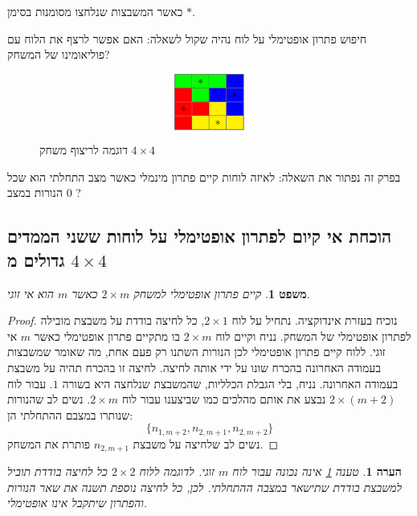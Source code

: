 \documentclass[12pt,leqno]{article}
\theoremstyle{theoremdd}
\newtheorem{theorem}{משפט}[section]
\newtheorem{comm}{הערה}[section]
\begin{document}
כאשר המשבצות שנלחצו מסומנות בסימן 
$*$.

חיפוש פתרון אופטימלי על לוח נהיה שקול לשאלה: האם אפשר 
לרצף את הלוח עם 
פוליאומינו
של המשחק?
\begin{figure}
    \caption*{דוגמה לריצוף משחק
    $4 \times 4$}
    \[ \begin{array}{|c|c|c|c|}
        \hline
        \cellcolor{green}&\cellcolor{green}* &\cellcolor{green} &\cellcolor{blue} \\
        \hline
        \cellcolor{red}&\cellcolor{green} &\cellcolor{blue} &\cellcolor{blue} *\\
        \hline
        \cellcolor{red}*&\cellcolor{red} &\cellcolor{yellow} &\cellcolor{blue} \\
        \hline
        \cellcolor{red}&\cellcolor{yellow}&\cellcolor{yellow}*&\cellcolor{yellow} \\
        \hline
        \end{array} \]
\end{figure}

בפרק זה נפתור את השאלה: לאיזה לוחות קיים פתרון מינמלי
כאשר מצב התחלתי הוא שכל הנורות במצב
$0$
?

\subsection{הוכחת אי קיום לפתרון אופטימלי על לוחות ששני הממדים גדולים מ
\texorpdfstring{$4 \times 4$}{4 x 4}}
\begin{theorem}
    \label{comm:sol to 2 x m}
    קיים פתרון אופטימלי למשחק 
    $2 \times m$
    כאשר 
    $m$
    הוא אי זוגי.
\end{theorem}
\begin{proof}
    נוכיח בעזרת אינדוקציה.
    נתחיל על לוח 
    $2 \times 1$,
    כל לחיצה בודדת על משבצת מובילה לפתרון אופטימלי של המשחק.
    נניח וקיים לוח 
    $2 \times m$
    בו מתקיים פתרון אופטימלי
    כאשר 
    $m$
    אי זוגי.
    ללוח קיים פתרון אופטימלי 
    לכן הנורות השתנו רק פעם אחת,
    מה שאומר שמשבצות בעמודה האחרונה 
    בהכרח שונו על ידי אותה לחיצה.
    לחיצה זו בהכרח תהיה על משבצת בעמודה האחרונה.
    נניח, בלי הגבלת הכלליות, שהמשבצת שנלחצה היא בשורה 
    $1$.
    עבור לוח 
    $2 \times (m+2)$
    נבצע את אותם מהלכים כמו שביצענו עבור לוח 
    $2 \times m$.
    נשים לב 
    שהנורות שנותרו במצבם ההתחלתי הן:
    \[ \{n_{1,m+2}, n_{2,m+1}, n_{2,m+2}\} \]
    נשים לב שלחיצה על 
    משבצת 
    $n_{2,m+1}$
    פותרת את המשחק.
\end{proof}
\begin{comm}
    טענה 
    \ref{comm:sol to 2 x m}
    אינה נכונה עבור לוח 
    $m$
    זוגי.
    לדוגמה
    ללוח 
    $2 \times 2$
    כל לחיצה בודדת תוביל למשבצת בודדת שתישאר במצבה ההתחלתי.
    לכן, כל לחיצה נוספת תשנה את שאר הנורות והפתרון שיתקבל אינו אופטימלי.
\end{comm}
\end{document}
